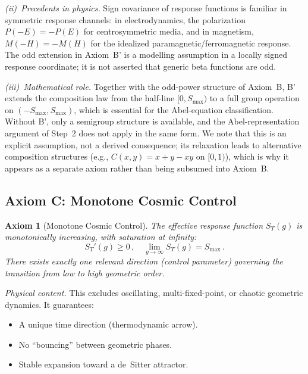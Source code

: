 \documentclass[aps,prd,twocolumn,superscriptaddress,nofootinbib]{revtex4-2}
\newtheorem{axiom}{Axiom}
\begin{document}
\textit{(ii)~Precedents in physics.} Sign covariance of response functions is familiar in symmetric response channels: in electrodynamics, the polarization $P(-E) = -P(E)$ for centrosymmetric media, and in magnetism, $M(-H) = -M(H)$ for the idealized paramagnetic/ferromagnetic response. The odd extension in Axiom~B' is a modelling assumption in a locally signed response coordinate; it is not asserted that generic beta functions are odd.

\textit{(iii)~Mathematical role.} Together with the odd-power structure of Axiom~B, B' extends the composition law from the half-line $[0, S_{\max})$ to a full group operation on $(-S_{\max}, S_{\max})$, which is essential for the Abel-equation classification. Without B', only a semigroup structure is available, and the Abel-representation argument of Step~2 does not apply in the same form. We note that this is an explicit assumption, not a derived consequence; its relaxation leads to alternative composition structures (e.g., $C(x,y) = x + y - xy$ on $[0,1)$), which is why it appears as a separate axiom rather than being subsumed into Axiom~B.

\subsection{Axiom C: Monotone Cosmic Control}

\begin{axiom}[Monotone Cosmic Control]
\label{ax:monotone}
The effective response function $S_T(g)$ is monotonically increasing, with saturation at infinity:
\begin{equation}
S_T'(g) \geq 0\,, \quad \lim_{g \to \infty} S_T(g) = S_{\max}\,.
\label{eq:monotone}
\end{equation}
There exists exactly one relevant direction (control parameter) governing the transition from low to high geometric order.
\end{axiom}

\textit{Physical content.} This excludes oscillating, multi-fixed-point, or chaotic geometric dynamics. It guarantees:
\begin{itemize}
\item A unique time direction (thermodynamic arrow).
\item No ``bouncing'' between geometric phases.
\item Stable expansion toward a de~Sitter attractor.
\end{itemize}
\end{document}
